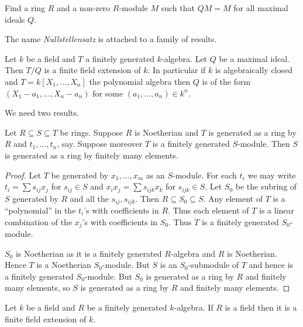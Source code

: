 \documentclass[a4paper]{article}
\begin{document}
\begin{ex}
  Find a ring \(R\) and a non-zero \(R\)-module \(M\) such that \(QM = M\) for all maximal ideals \(Q\).
\end{ex}

The name \emph{Nullstellensatz} is attached to a family of results.

\begin{theorem}
  \label{thm:weak Nullstellensatz}
  Let \(k\) be a field and \(T\) a finitely generated \(k\)-algebra. Let \(Q\) be a maximal ideal. Then \(T/Q\) is a finite field extension of \(k\). In particular if \(k\) is algebraically closed and \(T = k[X_1, \dots, X_n]\) the polynomial algebra then \(Q\) is of the form \((X_1 - a_1, \dots, X_n - a_n)\) for some \((a_1, \dots, a_n) \in k^n\).
\end{theorem}

We need two results.

\begin{lemma}
  Let \(R \subseteq S \subseteq T\) be rings. Suppose \(R\) is Noetherian and \(T\) is generated as a ring by \(R\) and \(t_1, \dots, t_n\), say. Suppose moreover \(T\) is a finitely generated \(S\)-module. Then \(S\) is generated as a ring by finitely many elements.
\end{lemma}

\begin{proof}
  Let \(T\) be generated by \(x_1, \dots, x_m\) as an \(S\)-module. For each \(t_i\) we may write \(t_i = \sum s_{ij} x_j\) for \(s_{ij} \in S\) and \(x_ix_j = \sum s_{ijk} x_k\) for \(s_{ijk} \in S\). Let \(S_0\) be the subring of \(S\) generated by \(R\) and all the \(s_{ij}, s_{ijk}\). Then \(R \subseteq S_0 \subseteq S\). Any element of \(T\) is a ``polynomial'' in the \(t_i\)'s with coefficients in \(R\). Thus each element of \(T\) is a linear combination of the \(x_j\)'s with coefficients in \(S_0\). Thus \(T\) is a finitely generated \(S_0\)-module.

  \(S_0\) is Noetherian as it is a finitely generated \(R\)-algebra and \(R\) is Noetherian. Hence \(T\) is a Noetherian \(S_0\)-module. But \(S\) is an \(S_0\)-submodule of \(T\) and hence is a finitely generated \(S_0\)-module. But \(S_0\) is generated as a ring by \(R\) and finitely many elements, so \(S\) is generated as a ring by \(R\) and finitely many elements.
\end{proof}

\begin{proposition}
  \label{prop:field that is fg algebra is a finite extension}
  Let \(k\) be a field and \(R\) be a finitely generated \(k\)-algebra. If \(R\) is a field then it is a finite field extension of \(k\).
\end{proposition}
\end{document}
